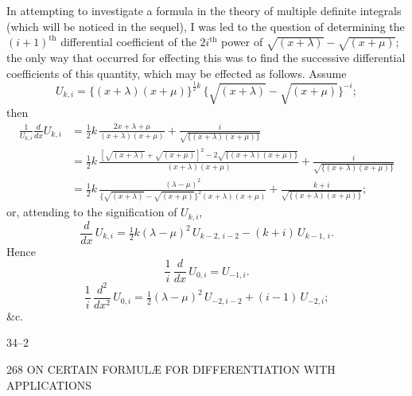 \documentclass[11pt]{article}
\begin{document}
In attempting to investigate a formula in the theory of multiple definite integrals (which will be noticed in the sequel), I was led to the question of determining the $(i+1)^{\text{th}}$ differential coefficient of the $2i^{\text{th}}$ power of $\sqrt{(x+\lambda)} - \sqrt{(x+\mu)}$; the only way that occurred for effecting this was to find the successive differential coefficients of this quantity, which may be effected as follows. Assume
\[
  U_{k,i} = \{(x+\lambda)(x+\mu)\}^{\frac{1}{2}k}\,\{\sqrt{(x+\lambda)} - \sqrt{(x+\mu)}\}^{-i};
\]
then
\begin{align*}
  \frac{1}{U_{k,i}}\frac{d}{dx}U_{k,i}
   &= \tfrac{1}{2}k\,\frac{2x+\lambda+\mu}{(x+\lambda)(x+\mu)} + \frac{i}{\sqrt{\{(x+\lambda)(x+\mu)\}}} \\
   &= \tfrac{1}{2}k\,\frac{[\sqrt{(x+\lambda)}+\sqrt{(x+\mu)}]^{2} - 2\sqrt{\{(x+\lambda)(x+\mu)\}}}{(x+\lambda)(x+\mu)}
      + \frac{i}{\sqrt{\{(x+\lambda)(x+\mu)\}}} \\
   &= \tfrac{1}{2}k\,\frac{(\lambda-\mu)^{2}}{\{\sqrt{(x+\lambda)} - \sqrt{(x+\mu)}\}^{2}(x+\lambda)(x+\mu)}
      + \frac{k+i}{\sqrt{\{(x+\lambda)(x+\mu)\}}};
\end{align*}
or, attending to the signification of $U_{k,i}$,
\[
  \frac{d}{dx}\,U_{k,i} = \tfrac{1}{2}k(\lambda-\mu)^{2}\,U_{k-2,\,i-2} - (k+i)\,U_{k-1,\,i}.
\]
Hence
\[
  \frac{1}{i}\,\frac{d}{dx}\,U_{0,i} = U_{-1,i}.
\]
\[
  \frac{1}{i}\,\frac{d^{2}}{dx^{2}}\,U_{0,i} = \tfrac{1}{2}(\lambda-\mu)^{2}\,U_{-2,i-2} + (i-1)\,U_{-2,i};
\]
\&c.

\hfill 34--2

\vspace{2em}

\begin{center}\small 268 \quad ON CERTAIN FORMUL\AE{} FOR DIFFERENTIATION WITH APPLICATIONS \quad [41]\end{center}
\end{document}
